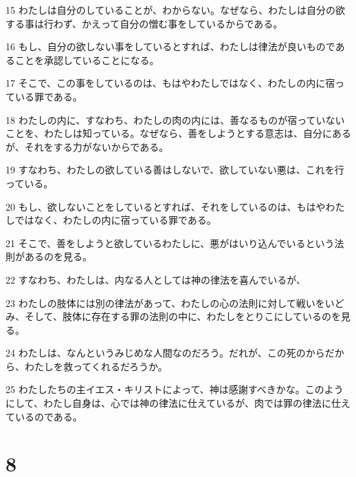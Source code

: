 \par 15 わたしは自分のしていることが、わからない。なぜなら、わたしは自分の欲する事は行わず、かえって自分の憎む事をしているからである。
\par 16 もし、自分の欲しない事をしているとすれば、わたしは律法が良いものであることを承認していることになる。
\par 17 そこで、この事をしているのは、もはやわたしではなく、わたしの内に宿っている罪である。
\par 18 わたしの内に、すなわち、わたしの肉の内には、善なるものが宿っていないことを、わたしは知っている。なぜなら、善をしようとする意志は、自分にあるが、それをする力がないからである。
\par 19 すなわち、わたしの欲している善はしないで、欲していない悪は、これを行っている。
\par 20 もし、欲しないことをしているとすれば、それをしているのは、もはやわたしではなく、わたしの内に宿っている罪である。
\par 21 そこで、善をしようと欲しているわたしに、悪がはいり込んでいるという法則があるのを見る。
\par 22 すなわち、わたしは、内なる人としては神の律法を喜んでいるが、
\par 23 わたしの肢体には別の律法があって、わたしの心の法則に対して戦いをいどみ、そして、肢体に存在する罪の法則の中に、わたしをとりこにしているのを見る。
\par 24 わたしは、なんというみじめな人間なのだろう。だれが、この死のからだから、わたしを救ってくれるだろうか。
\par 25 わたしたちの主イエス・キリストによって、神は感謝すべきかな。このようにして、わたし自身は、心では神の律法に仕えているが、肉では罪の律法に仕えているのである。

\chapter{8}

